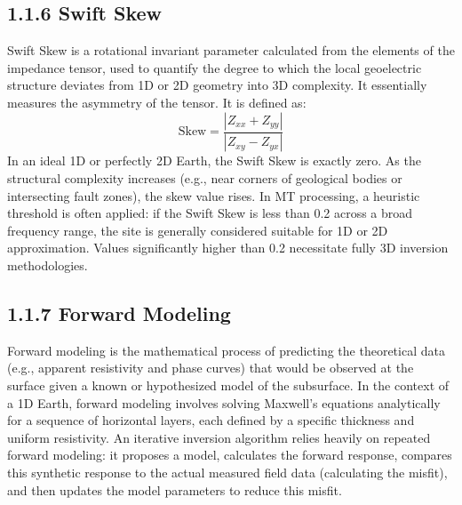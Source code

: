 \subsection{1.1.6 Swift Skew}
Swift Skew is a rotational invariant parameter calculated from the elements of the impedance tensor, used to quantify the degree to which the local geoelectric structure deviates from 1D or 2D geometry into 3D complexity. It essentially measures the asymmetry of the tensor. It is defined as:
\begin{equation}
\text{Skew} = \frac{|Z_{xx} + Z_{yy}|}{|Z_{xy} - Z_{yx}|}
\end{equation}
In an ideal 1D or perfectly 2D Earth, the Swift Skew is exactly zero. As the structural complexity increases (e.g., near corners of geological bodies or intersecting fault zones), the skew value rises. In MT processing, a heuristic threshold is often applied: if the Swift Skew is less than 0.2 across a broad frequency range, the site is generally considered suitable for 1D or 2D approximation. Values significantly higher than 0.2 necessitate fully 3D inversion methodologies.

\subsection{1.1.7 Forward Modeling}
Forward modeling is the mathematical process of predicting the theoretical data (e.g., apparent resistivity and phase curves) that would be observed at the surface given a known or hypothesized model of the subsurface. In the context of a 1D Earth, forward modeling involves solving Maxwell's equations analytically for a sequence of horizontal layers, each defined by a specific thickness and uniform resistivity. An iterative inversion algorithm relies heavily on repeated forward modeling: it proposes a model, calculates the forward response, compares this synthetic response to the actual measured field data (calculating the misfit), and then updates the model parameters to reduce this misfit.

